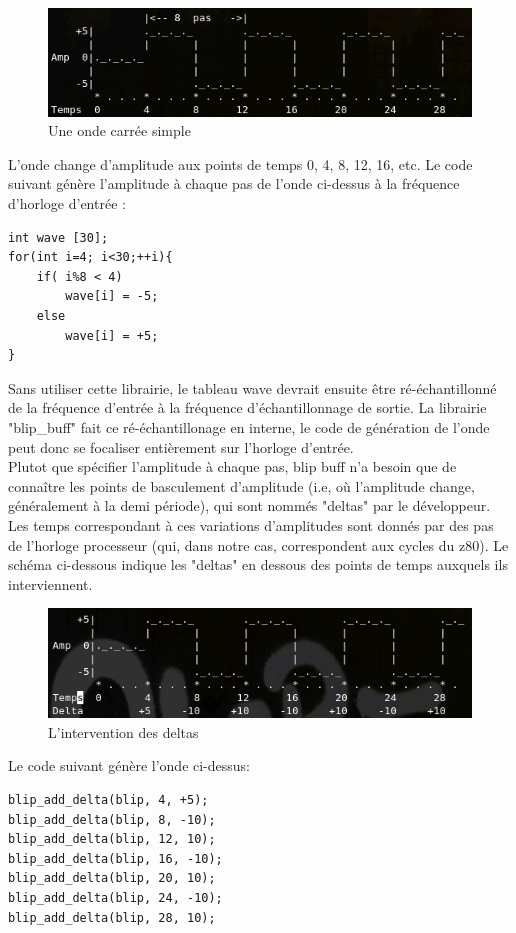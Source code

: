 \documentclass{report}
\begin{document}
\begin{figure}[!h]
\centering
\includegraphics[scale=0.5]{images/Wave1.jpg}
\caption{Une onde carrée simple}
\label{WAV1}
\end{figure}

L'onde change d'amplitude aux points de temps 0, 4, 8, 12, 16, etc.
Le code suivant génère l'amplitude à chaque pas de l'onde ci-dessus à la fréquence d'horloge d'entrée : 
\begin{lstlisting}
int wave [30];
for(int i=4; i<30;++i){
	if( i%8 < 4)
		wave[i] = -5;
	else 
		wave[i] = +5;
}
\end{lstlisting}
Sans utiliser cette librairie, le tableau wave devrait ensuite être ré-échantillonné de la fréquence d'entrée à la fréquence d'échantillonnage de sortie. La librairie "blip\_buff" fait ce ré-échantillonage en interne, le code de génération de l'onde peut donc se focaliser entièrement sur l'horloge d'entrée.\\
Plutot que spécifier l'amplitude à chaque pas, blip buff n'a besoin que de connaître les points de basculement d'amplitude (i.e, où l'amplitude change, généralement à la demi période), qui sont nommés "deltas" par le développeur. Les temps correspondant à ces variations d'amplitudes sont donnés par des pas de l'horloge processeur (qui, dans notre cas, correspondent aux cycles du z80). 
Le schéma ci-dessous indique les "deltas" en dessous des points de temps auxquels ils interviennent.

\begin{figure}[!h]
\centering
\includegraphics[scale=0.5]{images/Wave2.jpg}
\caption{L'intervention des deltas}
\label{WAV2}
\end{figure}

Le code suivant génère l'onde ci-dessus:
\begin{lstlisting}
blip_add_delta(blip, 4, +5);
blip_add_delta(blip, 8, -10);
blip_add_delta(blip, 12, 10);
blip_add_delta(blip, 16, -10);
blip_add_delta(blip, 20, 10);
blip_add_delta(blip, 24, -10);
blip_add_delta(blip, 28, 10);
\end{lstlisting}
\end{document}
